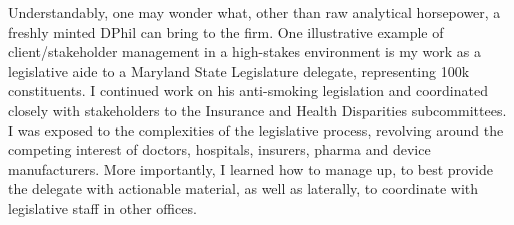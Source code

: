 \documentclass{../res}
\begin{document}
\begin{sloppypar}
\begin{resume}
Understandably, one may wonder what, other than raw analytical horsepower, a freshly minted DPhil can bring to the firm. One illustrative example of client/stakeholder management in a high-stakes environment is my work as a legislative aide to a Maryland State Legislature delegate, representing 100k constituents. I continued work on his anti-smoking legislation and coordinated closely with stakeholders to the Insurance and Health Disparities subcommittees. I was exposed to the complexities of the legislative process, revolving around the competing interest of doctors, hospitals, insurers, pharma and device manufacturers. More importantly, I learned how to manage up, to best provide the delegate with actionable material, as well as laterally, to coordinate with legislative staff in other offices.








\end{resume}
\end{sloppypar}
\end{document}
